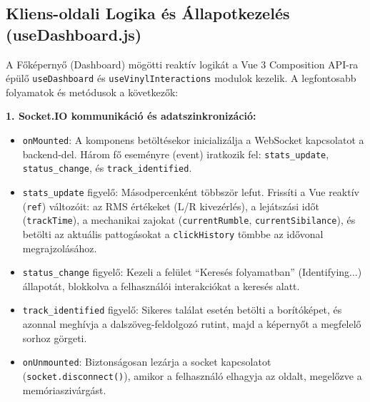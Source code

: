 \subsection{Kliens-oldali Logika és Állapotkezelés (useDashboard.js)}
A Főképernyő (Dashboard) mögötti reaktív logikát a Vue 3 Composition API-ra épülő \texttt{useDashboard} és \texttt{useVinylInteractions} modulok kezelik. A legfontosabb folyamatok és metódusok a következők:

\textbf{1. Socket.IO kommunikáció és adatszinkronizáció:}
\begin{itemize}
    \item \texttt{onMounted}: A komponens betöltésekor inicializálja a WebSocket kapcsolatot a backend-del. Három fő eseményre (event) iratkozik fel: \texttt{stats\_update}, \texttt{status\_change}, és \texttt{track\_identified}.
    \item \texttt{stats\_update} figyelő: Másodpercenként többször lefut. Frissíti a Vue reaktív (\texttt{ref}) változóit: az RMS értékeket (L/R kivezérlés), a lejátszási időt (\texttt{trackTime}), a mechanikai zajokat (\texttt{currentRumble}, \texttt{currentSibilance}), és betölti az aktuális pattogásokat a \texttt{clickHistory} tömbbe az idővonal megrajzolásához.
    \item \texttt{status\_change} figyelő: Kezeli a felület ``Keresés folyamatban'' (Identifying...) állapotát, blokkolva a felhasználói interakciókat a keresés alatt.
    \item \texttt{track\_identified} figyelő: Sikeres találat esetén betölti a borítóképet, és azonnal meghívja a dalszöveg-feldolgozó rutint, majd a képernyőt a megfelelő sorhoz görgeti.
    \item \texttt{onUnmounted}: Biztonságosan lezárja a socket kapcsolatot (\texttt{socket.disconnect()}), amikor a felhasználó elhagyja az oldalt, megelőzve a memóriaszivárgást.
\end{itemize}

